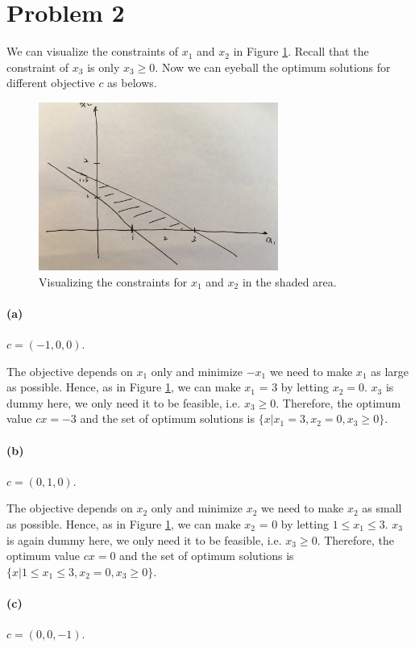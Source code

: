 \documentclass[12pt]{article}
\begin{document}
\section*{Problem 2}
We can visualize the constraints of $x_1$ and $x_2$ in Figure \ref{fig:2}. Recall that the constraint of $x_3$ is only $x_3 \geq 0$. Now we can eyeball the optimum solutions for different objective $c$ as belows. 
\begin{figure}[h!]
	\centering
	\includegraphics[width=0.7\textwidth]{2.jpg}
	\caption{Visualizing the constraints for $x_1$ and $x_2$ in the shaded area.}
	\label{fig:2}
\end{figure}
\paragraph{(a)} $c = (-1,0,0)$. 

The objective depends on $x_1$ only and minimize $-x_1$ we need to make $x_1$ as large as possible. Hence, as in Figure \ref{fig:2}, we can make $x_1$ = 3 by letting $x_2=0$. $x_3$ is dummy here, we only need it to be feasible, i.e. $x_3 \geq 0$. Therefore, the optimum value $cx = -3$ and the set of optimum solutions is $\{x | x_1 = 3, x_2 = 0, x_3 \geq0\}$.

\paragraph{(b)} $c = (0,1,0)$. 

The objective depends on $x_2$ only and minimize $x_2$ we need to make $x_2$ as small as possible. Hence, as in Figure \ref{fig:2}, we can make $x_2$ = 0 by letting $1 \leq x_1 \leq 3$. $x_3$ is again dummy here, we only need it to be feasible, i.e. $x_3 \geq 0$. Therefore, the optimum value $cx = 0$ and the set of optimum solutions is $\{x | 1 \leq x_1 \leq 3, x_2 = 0, x_3 \geq0\}$.

\paragraph{(c)} $c = (0,0,-1)$. 
\end{document}
